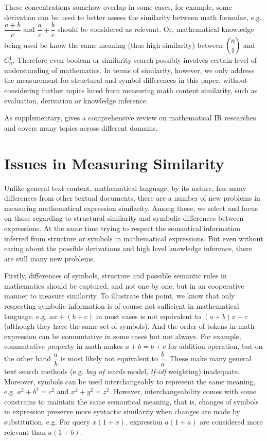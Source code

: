 These concentrations somehow overlap in some cases, for example, some derivation can be used to better assess the similarity between math formulae, e.g. $\dfrac{a + b}{c}$ and $\dfrac{a}{c} + \dfrac{b}{c}$ should be considered as relevant.
Or, mathematical knowledge being used be know the same meaning (thus high similarity) between $ \dbinom n 1 $ and $C_n^1$.
Therefore even boolean or similarity search possibly involves certain level of understanding of mathematics. In terms of similarity, however, we only address the measurement for structural and symbol differences in this paper, without considering further topics lured from measuring math content similarity, such as evaluation, derivation or knowledge inference.

As supplementary, \cite{goodsurvey} gives a comprehensive review on mathematical IR researches and covers many topics across different domains.

\section{Issues in Measuring Similarity}
\label{measure_sim}
Unlike general text content, mathematical language, by its nature, has many differences from other textual documents, there are a number of new problems in measuring mathematical expression similarity. 
Among these, we select and focus on those regarding to structural similarity and symbolic differences between expressions. 
At the same time trying to respect the semantical information inferred from structure or symbols in mathematical expressions.
But even without caring about the possible derivations and high level knowledge inference, there are still many new problems.

Firstly, differences of symbols, structure and possible semantic rules in mathematics should be captured, and not one by one, but in an cooperative manner to measure similarity. 
To illustrate this point, we know that only respecting symbolic information is of course not sufficient in mathematical language. e.g. $ax+(b+c)$ in most cases is not equivalent to $(a+b)x+c$ (although they have the same set of symbols).
And the order of tokens in math expression can be commutative in some cases but not always. For example, commutative property in math makes $a+b=b+c$ for addition operation, but on the other hand $\dfrac a b$ is most likely not equivalent to $\dfrac b a$.
These make many general text search methods (e.g. \textit{bag of words} model, \textit{tf-idf} weighting) inadequate. 
Moreover, symbols can be used interchangeably to represent the same meaning, e.g. $a^2+b^2=c^2$ and $x^2+y^2=z^2$. 
However, interchangeability comes with some constrains to maintain the same semantical meaning, that is, changes of symbols in expression preserve more syntactic similarity when changes are made by substitution. e.g. For query $x(1+x)$, expression $a(1+a)$ are considered more relevant than $a(1+b)$. 

